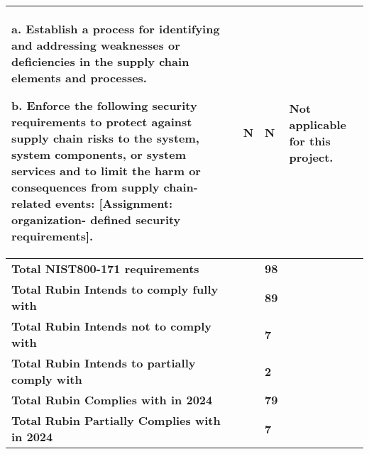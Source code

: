 \begin{longtable} {|p{}|p{}|p{}|p{} |}
{a. Establish a process for identifying and addressing weaknesses or deficiencies in the supply chain elements and processes.

b. Enforce the following security requirements to protect against supply chain risks to the system, system components, or system services and to limit the harm or consequences from supply chain-related events: [Assignment: organization- defined security requirements].}&{N}&{N}&{Not applicable for this project.} \\ \hline
\textbf{Total NIST800-171 requirements}&\textbf{}&\textbf{98}& \\ \hline
\textbf{Total Rubin Intends to comply fully with }&\textbf{}&\textbf{89}& \\ \hline
\textbf{Total Rubin Intends not to comply with }&\textbf{}&\textbf{7}& \\ \hline
\textbf{Total Rubin Intends to partially comply with }&\textbf{}&\textbf{2}& \\ \hline
\textbf{Total Rubin Complies with in 2024}&\textbf{}&\textbf{79}& \\ \hline
\textbf{Total Rubin Partially Complies with in 2024}&\textbf{}&\textbf{7}& \\ \hline
\end{longtable} \normalsize
